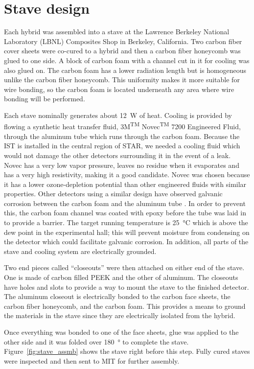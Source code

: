 \documentclass[1p,12pt]{elsarticle}
\begin{document}
\section{Stave design}
Each hybrid was assembled into a stave at the Lawrence Berkeley National Laboratory (LBNL) Composites Shop in Berkeley,
California. Two carbon fiber cover sheets were co-cured to a hybrid and then a
carbon fiber honeycomb was glued to one side. A block of carbon foam with a
channel cut in it for cooling was also glued on. The carbon foam has a lower
radiation length but is homogeneous unlike the carbon fiber honeycomb. This
uniformity makes it more suitable for wire bonding, so the carbon foam is
located underneath any area where wire bonding will be performed.

Each stave nominally generates about \SI{12}{\watt} of heat. Cooling is provided by flowing a synthetic heat transfer fluid, 3M\textsuperscript{TM}
Novec\textsuperscript{TM} 7200 Engineered Fluid,
through the aluminum tube which runs through the carbon
foam. Because the IST is installed in the central region of STAR, we needed a
cooling fluid which would not damage the other detectors surrounding it in the
event of a leak. Novec has a very low vapor pressure, leaves no residue when it
evaporates and has a very high resistivity, making it a good candidate. Novec was chosen because it has a
lower ozone-depletion potential than other engineered fluids with similar
properties.  Other detectors using a similar design have observed galvanic corrosion
between the carbon foam and the aluminum tube \cite{ref:novec}. In order to prevent this, the
carbon foam channel was coated with epoxy before the tube was laid in to provide a
barrier. The target running temperature is \SI{25}{\degreeCelsius} which is above the
dew point in the experimental hall; this will prevent moisture from condensing
on the detector which could facilitate galvanic corrosion. In addition, all
parts of the stave and cooling system are electrically grounded.

Two end pieces called ``closeouts'' were then attached on either end of the stave. One
is made of carbon filled PEEK and the other of aluminum. The closeouts have
holes and slots to provide a way to mount the stave to the finished detector. The
aluminum closeout is electrically bonded to the carbon face sheets, the carbon
fiber honeycomb, and the carbon foam. This provides a means to ground the
materials in the stave since they are electrically isolated from the hybrid.

Once everything was bonded to one of the face sheets, glue was applied to
the other side and it was folded over \SI{180}{\degree} to complete the stave.
Figure~\ref{fig:stave_assmb} shows the stave right before this step. Fully
cured staves were inspected and then sent to MIT for further assembly.
\end{document}
